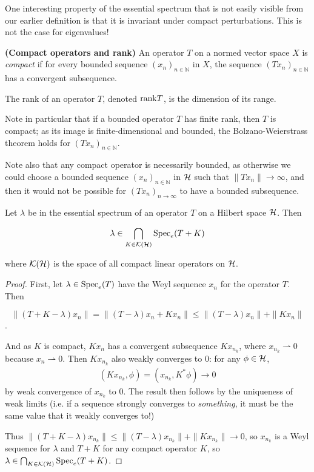 \documentclass[../main.tex]{subfiles}
\begin{document}
One interesting property of the essential spectrum that is not easily visible
from our earlier definition is that it is invariant under compact perturbations.
This is not the case for eigenvalues!

\begin{definition}{\textbf{(Compact operators and rank)}}
  An operator $T$ on a normed vector space $X$ is \emph{compact} if for every
  bounded sequence $(x_n)_{n \in \mathbb{N}}$ in $X$, the sequence
  $(Tx_n)_{n \in \mathbb{N}}$ has a convergent subsequence.

  The rank of an operator $T$, denoted $\mathrm{rank} T$, is the dimension of its range.
\end{definition}

Note in particular that if a bounded operator $T$ has finite rank, then $T$ is
compact; as its image is finite-dimensional and bounded, the Bolzano-Weierstrass
theorem holds for $(Tx_n)_{n \in \mathbb{N}}$.

Note also that any compact operator is necessarily bounded, as otherwise we
could choose a bounded sequence $(x_n)_{n \in \mathbb{N}}$ in $\mathcal{H}$ such
that $\|Tx_n\| \rightarrow \infty$, and then it would not be possible for
$(Tx_n)_{n \rightarrow \infty}$ to have a bounded subsequence. 

\begin{theorem}
  Let $\lambda$ be in the essential spectrum of an operator $T$ on a Hilbert space
  $\mathcal{H}$. Then

  \begin{equation}
  \label{eqn:weyl_spectrum}
    \lambda \in \bigcap_{K \in \mathcal{K}(\mathcal{H})} \mathrm{Spec}_e(T + K)
  \end{equation}

  where $\mathcal{K}(\mathcal{H})$ is the space of all compact linear operators on $\mathcal{H}$.
\end{theorem}
\begin{proof}
First, let $\lambda \in \mathrm{Spec}_e(T)$ have the Weyl sequence $x_n$ for the operator $T$. Then 

$$\|(T+K-\lambda)x_n\| = \|(T - \lambda)x_n+Kx_n\| \leq \|(T - \lambda)x_n\| + \|Kx_n\|$$. 

And as $K$ is compact, $Kx_n$ has a convergent subsequence $Kx_{n_k}$, where
$x_{n_k} \rightharpoonup 0$ because $x_n \rightharpoonup 0$. Then
$Kx_{n_k}$ also weakly converges to 0: for any $\phi \in \mathcal{H}$,
\begin{align*}
(Kx_{n_k}, \phi) = (x_{n_k}, K^* \phi) \rightarrow 0
\end{align*}
by weak convergence of $x_{n_k}$ to 0. The result then follows by the uniqueness
of weak limits (i.e. if a sequence strongly converges to
\emph{something}, it must be the same value that it weakly converges to!)

Thus $\|(T+K-\lambda)x_{n_k}\| \leq \|(T - \lambda)x_{n_k}\| + \|Kx_{n_k}\|
\rightarrow 0$, so $x_{n_k}$ is a Weyl sequence for $\lambda$ and $T+K$
for any compact operator $K$, so $\lambda \in \bigcap_{K \in
\mathcal{K}(\mathcal{H})} \mathrm{Spec}_e(T + K)$.
\end{proof}
\end{document}
